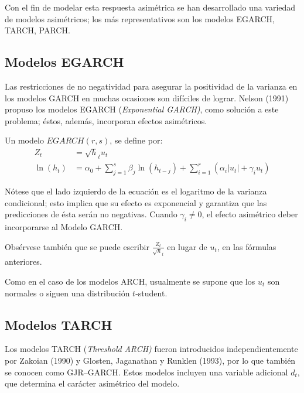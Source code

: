Con el fin de modelar esta respuesta asim\'{e}trica se han desarrollado una variedad de modelos asim\'{e}tricos; los m\'{a}s representativos son los modelos EGARCH, TARCH, PARCH. 

\subsection*{Modelos EGARCH}

Las restricciones de no negatividad para asegurar la positividad de la varianza en los modelos GARCH en muchas ocasiones son dif\'{i}ciles de lograr. Nelson (1991) propuso los modelos EGARCH (\textit{Exponential GARCH)}, como soluci\'{o}n a este problema; \'{e}stos, adem\'{a}s, incorporan efectos asim\'{e}tricos.

\begin{definicion}
Un modelo $EGARCH(r,s)$, se define por:
\begin{align*}
 Z_{t}&=\sqrt h_{t} u_{t} \\ 
 \ln \left( h_{t} \right)&=\alpha_{0}+\sum_{j=1}^s {\beta_{j}\ln \left( h_{t-j} \right)} +\sum_{i=1}^r \left( \alpha_{i}\left| u_{t} \right|+\gamma_{i}u_{t} \right)
\end{align*}
\end{definicion}

N\'{o}tese que el lado izquierdo de la ecuaci\'{o}n es el logaritmo de la varianza condicional; esto implica que su efecto es exponencial y garantiza que las predicciones de \'{e}sta ser\'{a}n no negativas. Cuando $\gamma_{i}\neq 0$, el efecto asim\'{e}trico deber incorporarse al Modelo GARCH.\newline

Obs\'{e}rvese tambi\'{e}n que se puede escribir $\frac{Z_{t}}{\sqrt h_{t} }$ en lugar de $u_{t}$, en las f\'{o}rmulas anteriores.\newline

Como en el caso de los modelos ARCH, usualmente se supone que los $u_{t}$ son normales o siguen una distribuci\'{o}n $t$-student.

\subsection*{Modelos TARCH}

Los modelos TARCH (\textit{Threshold} \textit{ARCH)} fueron introducidos independientemente por Zakoian (1990) y Glosten, Jaganathan y Runklen (1993), por lo que tambi\'{e}n se conocen como GJR--GARCH. Estos modelos incluyen una variable adicional $d_{t}$, que determina el car\'{a}cter asim\'{e}trico del modelo.


